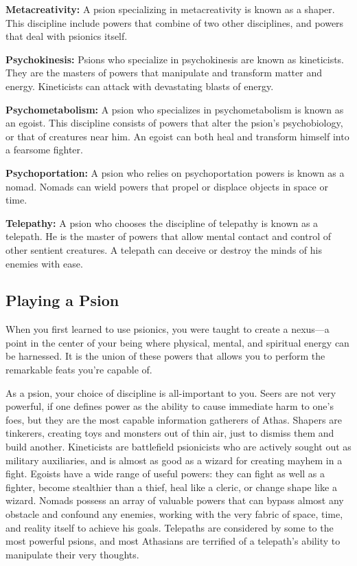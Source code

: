 \textbf{Metacreativity:} A psion specializing in metacreativity is known as a shaper. This discipline include powers that combine of two other disciplines, and powers that deal with psionics itself. %

\textbf{Psychokinesis:} Psions who specialize in psychokinesis are known as kineticists. They are the masters of powers that manipulate and transform matter and energy. Kineticists can attack with devastating blasts of energy.

\textbf{Psychometabolism:} A psion who specializes in psychometabolism is known as an egoist. This discipline consists of powers that alter the psion's psychobiology, or that of creatures near him. An egoist can both heal and transform himself into a fearsome fighter.

\textbf{Psychoportation:} A psion who relies on psychoportation powers is known as a nomad. Nomads can wield powers that propel or displace objects in space or time.

\textbf{Telepathy:} A psion who chooses the discipline of telepathy is known as a telepath. He is the master of powers that allow mental contact and control of other sentient creatures. A telepath can deceive or destroy the minds of his enemies with ease.

\subsection{Playing a Psion}
When you first learned to use psionics, you were taught to create a nexus---a point in the center of your being where physical, mental, and spiritual energy can be harnessed. It is the union of these powers that allows you to perform the remarkable feats you're capable of.

As a psion, your choice of discipline is all-important to you. Seers are not very powerful, if one defines power as the ability to cause immediate harm to one's foes, but they are the most capable information gatherers of Athas. Shapers are tinkerers, creating toys and monsters out of thin air, just to dismiss them and build another. Kineticists are battlefield psionicists who are actively sought out as military auxiliaries, and is almost as good as a wizard for creating mayhem in a fight. Egoists have a wide range of useful powers: they can fight as well as a fighter, become stealthier than a thief, heal like a cleric, or change shape like a wizard. Nomads possess an array of valuable powers that can bypass almost any obstacle and confound any enemies, working with the very fabric of space, time, and reality itself to achieve his goals. Telepaths are considered by some to the most powerful psions, and most Athasians are terrified of a telepath's ability to manipulate their very thoughts.

